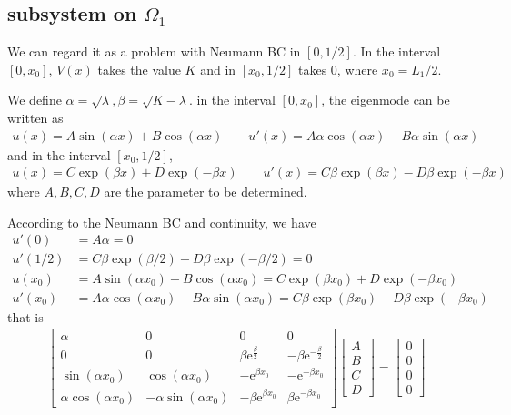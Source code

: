 \documentclass[12pt,a4paper]{article}
\begin{document}
\begin{appendices}
\subsection*{subsystem on $\Omega_1$}

We can regard it as a problem with Neumann BC in $[0, 1/2]$. In the interval $[0, x_0]$, $V(x)$ takes the value $K$ and in $[x_0, 1/2]$ takes $0$, where $x_0 = L_1/2$.

We define $\alpha = \sqrt{\lambda}, \beta = \sqrt{K - \lambda}$. in the interval $[0, x_0]$, the eigenmode can be written as
\begin{align*}
u(x) = A \sin(\alpha x) + B \cos(\alpha x) \qquad u'(x) = A \alpha \cos(\alpha x) - B \alpha \sin(\alpha x)
\end{align*}
and in the interval $[x_0, 1/2]$,
\begin{align*}
u(x) = C \exp(\beta x) + D \exp(-\beta x) \qquad u'(x) = C \beta \exp(\beta x) - D \beta \exp(-\beta x)
\end{align*}
where $A ,B, C, D$ are the parameter to be determined.

According to the Neumann BC and continuity, we have
\begin{align*}
u'(0) & = A \alpha = 0 \\
u'(1/2) & = C \beta \exp(\beta/2) - D \beta \exp(-\beta/2) = 0 \\
u(x_0) & = A \sin(\alpha x_0) + B \cos(\alpha x_0) = C \exp(\beta x_0) + D \exp(-\beta x_0) \\
u'(x_0) & = A \alpha \cos(\alpha x_0) - B \alpha \sin(\alpha x_0) = C \beta \exp(\beta x_0) - D \beta \exp(-\beta x_0)
\end{align*}
that is
\begin{align*}
\left[\begin{array}{cccc} \alpha & 0 & 0 & 0\\ 0 & 0 & \beta \mathrm{e}^{\frac{\beta}{2}} & - \beta \mathrm{e}^{-\frac{\beta}{2}}\\ \sin\!\left(\alpha x_0\right) & \cos\!\left(\alpha x_0\right) & - \mathrm{e}^{\beta x_0} & - \mathrm{e}^{- \beta x_0}\\ \alpha \cos\!\left(\alpha x_0\right) & - \alpha \sin\!\left(\alpha x_0\right) & - \beta \mathrm{e}^{\beta x_0} & \beta \mathrm{e}^{- \beta x_0} \end{array}\right]
\left[\begin{array}{c} A \\ B \\ C \\ D \end{array}\right]
=
\left[\begin{array}{c} 0 \\ 0 \\ 0 \\ 0 \end{array}\right]
\end{align*}


\end{appendices}
\end{document}

